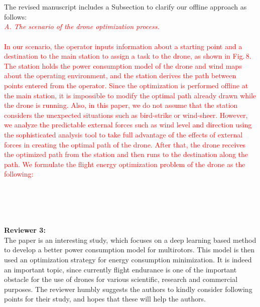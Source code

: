 \documentclass[onecolumn]{IEEEconf}
\begin{document}
\begin{description}
{	~\\
    ~\\
   The revised manuscript includes a Subsection to clarify our offline approach as follows: ~\\
   }
\textcolor{red}{
\textcolor{red}{\textit{A. The scenario of the drone optimization process.}}~\\~\\
In our scenario, the operator inputs information about a starting point and a destination to the main station to assign a task to the drone, as shown in Fig.\,8.
The station holds the power consumption model of the drone and wind maps about the operating environment, and the station derives the path between points entered from the operator.
Since the optimization is performed offline at the main station, it is impossible to modify the optimal path already drawn while the drone is running. Also, in this paper, we do not assume that the station considers the unexpected situations such as bird-strike or wind-sheer.
However, we analyze the predictable external forces such as wind level and direction using the sophisticated analysis tool to take full advantage of the effects of external forces in creating the optimal path of the drone. 
After that, the drone receives the optimized path from the station and then runs to the destination along the path. We formulate the flight energy optimization problem of the drone as the following:}
\\
\\
\end{description}
~\\
~\\
~\\
\textbf{\large Reviewer 3:}\\
The paper is an interesting study, which focuses on a deep learning based method to develop a better power consumption model for multirotors.
This model is then used an optimization strategy for energy consumption minimization. It is indeed an important topic, since currently flight endurance is one of the important obstacle for the use of drones for various scientific, research and commercial purposes. The reviewer humbly suggests the authors to kindly consider following points for their study, and hopes that these will help the authors.
\end{document}

